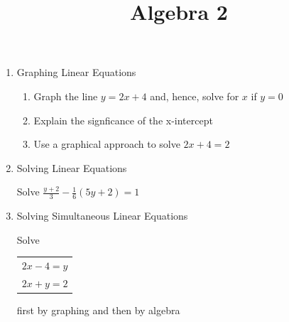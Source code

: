 \documentclass[a4paper,14pt]{extarticle}
\title{\vspace{-2cm}\textbf{Algebra 2}}
\author{}
\date{}
\begin{document}
\maketitle

\vspace{-4.5cm}
\begin{enumerate}
\item Graphing Linear Equations 
\begin{enumerate}
\item
\par{Graph the line $y = 2x + 4$ and, hence, solve for $x$ if $y = 0$}
\item
\par{Explain the signficance of the x-intercept}
\item
\par{Use a graphical approach to solve $2x + 4 = 2$}
\end{enumerate}

\vspace{-0.75cm}
\begin{center}
\end{center}
\newpage

\item Solving Linear Equations\\[8pt]
\par{Solve $\frac{y+2}{3} - \frac{1}{6}(5y+2) = 1$}
\vspace{10cm}

\item Solving Simultaneous Linear Equations\\[8pt]
\par{Solve
\begin{tabular}{ c }
 $2x - 4 = y$\\
 $2x + y = 2$ 
\end{tabular}  first by graphing and then by algebra}

\vspace{-0.75cm}
\begin{center}
\end{center}
\newpage


\end{enumerate}
\end{document}
